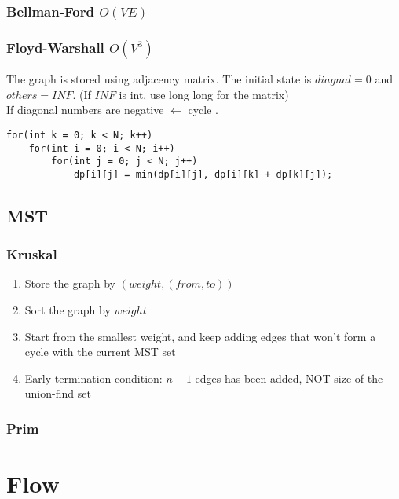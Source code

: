 \documentclass[10pt,oneside]{article}
\begin{document}
\begin{landscape}
\begin{multicols}{2}
\subsubsection{Bellman-Ford $O(VE)$}


\subsubsection{Floyd-Warshall $O(V^3)$}

The graph is stored using adjacency matrix. The initial state is $diagnal = 0$ and $others = INF$. (If $INF$ is int, use long long for the matrix)\\
If diagonal numbers are negative $\leftarrow$ cycle . \\

\begin{lstlisting}
for(int k = 0; k < N; k++)
	for(int i = 0; i < N; i++)
		for(int j = 0; j < N; j++)
			dp[i][j] = min(dp[i][j], dp[i][k] + dp[k][j]);
\end{lstlisting}

\subsection{MST}

\subsubsection{Kruskal}

\begin{enumerate}
	\item Store the graph by $(weight, (from , to))$
	\item Sort the graph by $weight$ 
	\item Start from the smallest weight, and keep adding edges that won't form a cycle with the current MST set
	\item Early termination condition: $n - 1$ edges has been added, NOT size of the union-find set
\end{enumerate}

\subsubsection{Prim}

\section{Flow}


\end{multicols}
\end{landscape}
\end{document}
